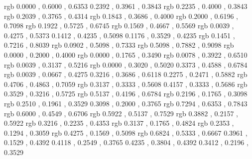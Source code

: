 \definecolor{shinbashi}	{rgb}	{	0.0000	,	0.6000	,	0.6353	}
\definecolor{sabionando}{rgb}	{	0.2392	,	0.3961	,	0.3843	}
\definecolor{ainezumi}	{rgb}	{	0.2235	,	0.4000	,	0.3843	}
\definecolor{ai}	{rgb}	{	0.2039	,	0.3765	,	0.4314	}
\definecolor{onando}	{rgb}	{	0.1843	,	0.3686	,	0.4000	}
\definecolor{hanaasagi}	{rgb}	{	0.2000	,	0.6196	,	0.7098	}
\definecolor{chigusa}	{rgb}	{	0.1922	,	0.5725	,	0.6745	}
\definecolor{masuhana}	{rgb}	{	0.1569	,	0.4667	,	0.5569	}
\definecolor{hanada}	{rgb}	{	0.0039	,	0.4275	,	0.5373	}
\definecolor{noshimehana}{rgb}	{	0.1412	,	0.4235	,	0.5098	}
\definecolor{omeshionando}{rgb}	{	0.1176	,	0.3529	,	0.4235	}
\definecolor{sora}	{rgb}	{	0.1451	,	0.7216	,	0.8039	}
\definecolor{konpeki}	{rgb}	{	0.0902	,	0.5098	,	0.7333	}
\definecolor{gunjo}	{rgb}	{	0.5098	,	0.7882	,	0.9098	}
\definecolor{kon}	{rgb}	{	0.0000	,	0.2000	,	0.4000	}
\definecolor{kachi}	{rgb}	{	0.0000	,	0.1765	,	0.3490	}
\definecolor{ruri}	{rgb}	{	0.0078	,	0.3922	,	0.6510	}
\definecolor{konjo}	{rgb}	{	0.0039	,	0.3137	,	0.5216	}
\definecolor{rurikon}	{rgb}	{	0.0000	,	0.3020	,	0.5020	}
\definecolor{benimidori}{rgb}	{	0.3373	,	0.4588	,	0.6784	}
\definecolor{konkikyo}	{rgb}	{	0.0039	,	0.0667	,	0.4275	}
\definecolor{hujinezumi}{rgb}	{	0.3216	,	0.3686	,	0.6118	}
\definecolor{benikakehana}{rgb}	{	0.2275	,	0.2471	,	0.5882	}
\definecolor{hujiiro}	{rgb}	{	0.4706	,	0.4863	,	0.7059	}
\definecolor{hutaai}	{rgb}	{	0.3137	,	0.3333	,	0.5608	}
\definecolor{hujimurasaki}{rgb}	{	0.4157	,	0.3333	,	0.5686	}
\definecolor{kikyo}	{rgb}	{	0.3529	,	0.3216	,	0.5725	}
\definecolor{shion}	{rgb}	{	0.5137	,	0.4196	,	0.6784	}
\definecolor{messhi}	{rgb}	{	0.2196	,	0.1765	,	0.3098	}
\definecolor{shikon}	{rgb}	{	0.2510	,	0.1961	,	0.3529	}
\definecolor{kokimurasaki}{rgb}	{	0.3098	,	0.2000	,	0.3765	}
\definecolor{usu}	{rgb}	{	0.7294	,	0.6353	,	0.7843	}
\definecolor{hashita}	{rgb}	{	0.6000	,	0.4549	,	0.6706	}
\definecolor{rindo}	{rgb}	{	0.5922	,	0.5137	,	0.7529	}
\definecolor{sumire}	{rgb}	{	0.3882	,	0.2157	,	0.5922	}
\definecolor{nasukon}	{rgb}	{	0.3216	,	0.2235	,	0.4353	}
\definecolor{murasaki}	{rgb}	{	0.3137	,	0.1765	,	0.4824	}
\definecolor{kurobeni}	{rgb}	{	0.2353	,	0.1294	,	0.3059	}
\definecolor{ayame}	{rgb}	{	0.4275	,	0.1569	,	0.5098	}
\definecolor{benihuji}	{rgb}	{	0.6824	,	0.5333	,	0.6667	}
\definecolor{edomurasaki}{rgb}	{	0.3961	,	0.1529	,	0.4392	}
\definecolor{shikon}{rgb}       {	0.4118	,	0.2549	,	0.3765	}
\definecolor{hatobanezumi}{rgb}	{	0.4235	,	0.3804	,	0.4392	}
\definecolor{budonezumi}{rgb}	{	0.3412	,	0.2196	,	0.3529	}
